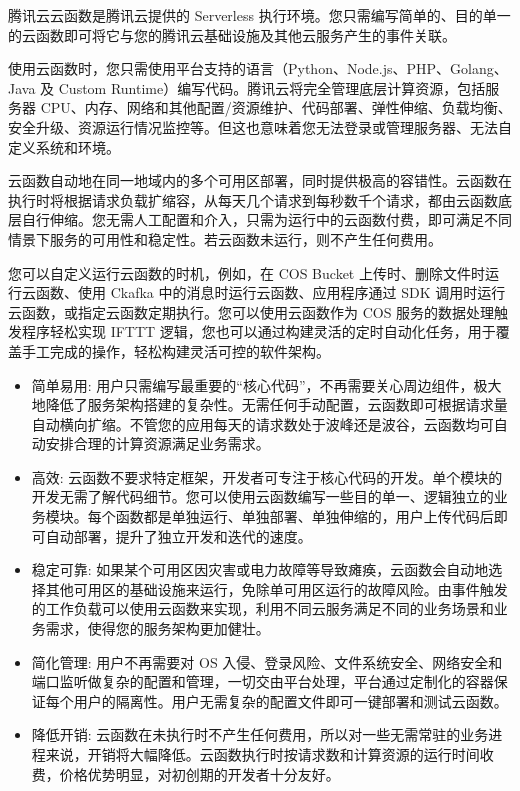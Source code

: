 \begin{definition}
    腾讯云云函数是腾讯云提供的 Serverless 执行环境。您只需编写简单的、目的单一的云函数即可将它与您的腾讯云基础设施及其他云服务产生的事件关联。

使用云函数时，您只需使用平台支持的语言（Python、Node.js、PHP、Golang、Java 及 Custom Runtime）编写代码。腾讯云将完全管理底层计算资源，包括服务器 CPU、内存、网络和其他配置/资源维护、代码部署、弹性伸缩、负载均衡、安全升级、资源运行情况监控等。但这也意味着您无法登录或管理服务器、无法自定义系统和环境。

云函数自动地在同一地域内的多个可用区部署，同时提供极高的容错性。云函数在执行时将根据请求负载扩缩容，从每天几个请求到每秒数千个请求，都由云函数底层自行伸缩。您无需人工配置和介入，只需为运行中的云函数付费，即可满足不同情景下服务的可用性和稳定性。若云函数未运行，则不产生任何费用。

您可以自定义运行云函数的时机，例如，在 COS Bucket 上传时、删除文件时运行云函数、使用 Ckafka 中的消息时运行云函数、应用程序通过 SDK 调用时运行云函数，或指定云函数定期执行。您可以使用云函数作为 COS 服务的数据处理触发程序轻松实现 IFTTT 逻辑，您也可以通过构建灵活的定时自动化任务，用于覆盖手工完成的操作，轻松构建灵活可控的软件架构。

\begin{itemize}
    \item 简单易用: 用户只需编写最重要的“核心代码”，不再需要关心周边组件，极大地降低了服务架构搭建的复杂性。无需任何手动配置，云函数即可根据请求量自动横向扩缩。不管您的应用每天的请求数处于波峰还是波谷，云函数均可自动安排合理的计算资源满足业务需求。
    \item 高效: 云函数不要求特定框架，开发者可专注于核心代码的开发。单个模块的开发无需了解代码细节。您可以使用云函数编写一些目的单一、逻辑独立的业务模块。每个函数都是单独运行、单独部署、单独伸缩的，用户上传代码后即可自动部署，提升了独立开发和迭代的速度。
    \item 稳定可靠: 如果某个可用区因灾害或电力故障等导致瘫痪，云函数会自动地选择其他可用区的基础设施来运行，免除单可用区运行的故障风险。由事件触发的工作负载可以使用云函数来实现，利用不同云服务满足不同的业务场景和业务需求，使得您的服务架构更加健壮。
    \item 简化管理: 用户不再需要对 OS 入侵、登录风险、文件系统安全、网络安全和端口监听做复杂的配置和管理，一切交由平台处理，平台通过定制化的容器保证每个用户的隔离性。用户无需复杂的配置文件即可一键部署和测试云函数。
    \item 降低开销: 云函数在未执行时不产生任何费用，所以对一些无需常驻的业务进程来说，开销将大幅降低。云函数执行时按请求数和计算资源的运行时间收费，价格优势明显，对初创期的开发者十分友好。
\end{itemize}
\end{definition}

